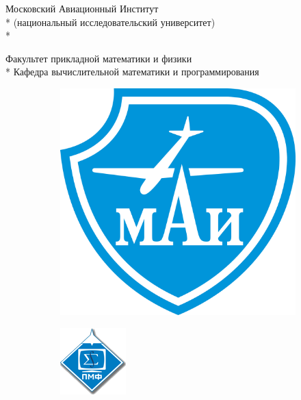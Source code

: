 \begin{titlepage}

\newpage

\begin{center}
Московский Авиационный Институт \\*
(национальный исследовательский университет) \\*

\vspace{2em}

Факультет прикладной математики и физики \\*
Кафедра вычислительной математики и программирования

\vspace{2em}

\begin{figure}[h]
  \begin{subfigure}[l]{0.75\textwidth}
    \includegraphics[scale=0.05]{../shared_images/university-logo.png}
  \end{subfigure}
  \begin{subfigure}[r]{0.2\textwidth}
    \includegraphics[scale=1,clip=false]{../shared_images/faculty-logo.png}
  \end{subfigure}
\end{figure}


\end{center}
\end{titlepage}
